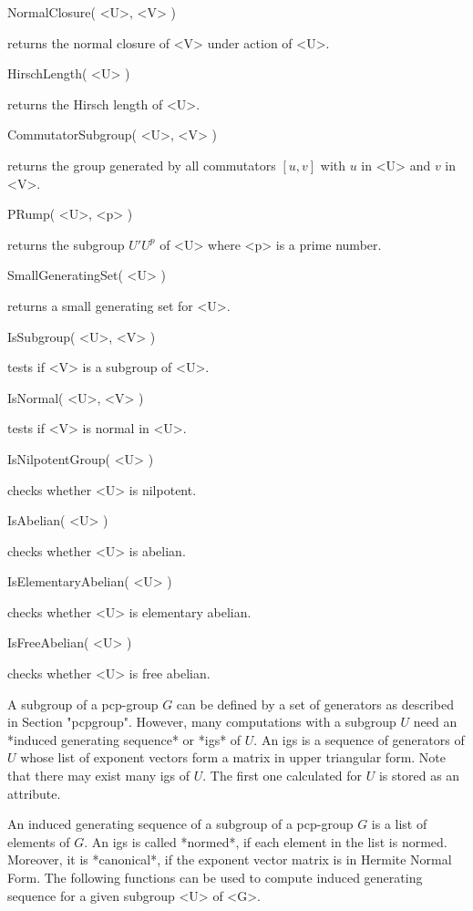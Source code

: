 \>NormalClosure( <U>, <V> )

returns  the normal closure of <V>  under action of <U>. 

\>HirschLength( <U> )

returns the Hirsch length of <U>.

\>CommutatorSubgroup( <U>, <V> )

returns the group generated by all commutators $[u,v]$ with $u$ in <U>
and $v$ in <V>.

\>PRump( <U>, <p> )

returns the subgroup $U'U^p$ of <U> where <p> is a prime number.

\> SmallGeneratingSet( <U> )

returns a small generating set for <U>.


\>IsSubgroup( <U>, <V> )

tests if <V> is a subgroup of <U>.

\>IsNormal( <U>, <V> )

tests if <V> is normal in <U>.

\>IsNilpotentGroup( <U> )

checks whether <U> is nilpotent.

\>IsAbelian( <U> )

checks whether <U> is abelian.

\>IsElementaryAbelian( <U> )

checks whether <U> is elementary abelian.

\>IsFreeAbelian( <U> )

checks whether <U> is free abelian.


A subgroup of a pcp-group $G$ can be defined by a set of generators as 
described in Section "pcpgroup". However, many computations  with a 
subgroup $U$ need  an *induced generating sequence* or *igs*  of $U$.  
An igs is a sequence of generators of $U$ whose list of exponent vectors  
form a matrix  in upper triangular form.  Note that there may  exist 
many igs of $U$.  The first one  calculated for $U$ is stored as an 
attribute.

An induced generating sequence of a subgroup of a pcp-group $G$ is a
list of elements of $G$.  An igs is called *normed*, if each element
in the list is normed.  Moreover, it is *canonical*, if the exponent
vector matrix is in Hermite Normal Form. The following functions can
be used to compute induced generating sequence for a given subgroup
<U> of <G>.

